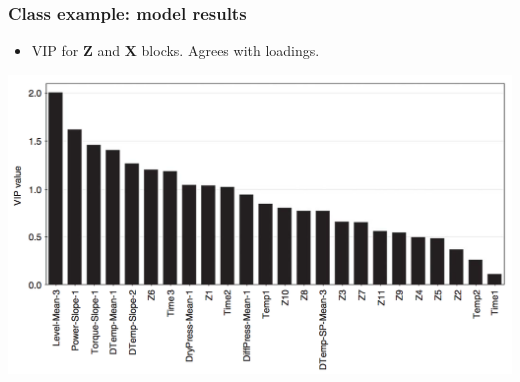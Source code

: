 \begin{frame}\frametitle{Class example: model results}
	
	\begin{itemize}
		\item	VIP for \( \mathbf{Z} \) and \( \mathbf{X} \) blocks. Agrees with loadings.
	\end{itemize}
	
	\begin{center}
		\includegraphics[width=\textwidth]{images/fmc/fmc-VIP-values-features.png}
	\end{center}
\end{frame}

\begin{frame}\frametitle{}

\end{frame}

% 	
% 	
% 	
% 	
% 	


